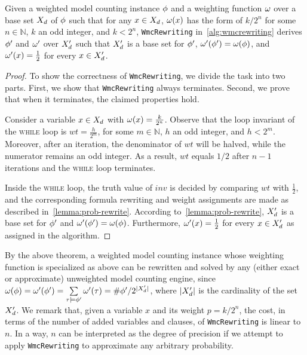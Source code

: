 \begin{theorem}
    \label{thm:prob-rewrite}
    Given a weighted model counting instance $\phi$ and
    a weighting function $\omega$ over a base set $X_d$ of $\phi$ such that
    for any $x\in X_d$, $\omega(x)$ has the form of $k/2^n$
    for some $n\in\mathbb{N}$,
    $k$ an odd integer,
    and $k < 2^n$,
    \texttt{WmcRewriting} in~\cref{alg:wmcrewriting} derives
    $\phi'$ and $\omega'$ over $X_d'$ such that $X_d'$ is a base set for $\phi'$,
    $\omega'(\phi')=\omega(\phi)$,
    and $\omega'(x)=\frac{1}{2}$ for every $x\in X_d'$.
\end{theorem}
\begin{proof}
    To show the correctness of \texttt{WmcRewriting},
    we divide the task into two parts.
    First, we show that \texttt{WmcRewriting} always terminates.
    Second, we prove that when it terminates, the claimed properties hold.

    Consider a variable $x\in X_d$ with $\omega(x)=\frac{k}{2^n}$.
    Observe that the loop invariant of the \textsc{while} loop is $wt=\frac{h}{2^m}$,
    for some $m\in\mathbb{N}$, $h$ an odd integer, and $h<2^m$.
    Moreover, after an iteration, the denominator of $wt$ will be halved,
    while the numerator remains an odd integer.
    As a result, $wt$ equals $1/2$ after $n-1$ iterations and the \textsc{while} loop terminates.

    Inside the \textsc{while} loop,
    the truth value of $inv$ is decided by comparing $wt$ with $\frac{1}{2}$,
    and the corresponding formula rewriting and weight assignments are made as described in~\cref{lemma:prob-rewrite}.
    According to~\cref{lemma:prob-rewrite},
    $X_d'$ is a base set for $\phi'$ and $\omega'(\phi')=\omega(\phi)$.
    Furthermore, $\omega'(x)=\frac{1}{2}$ for every $x\in X_d'$ as assigned in the algorithm.
\end{proof}
By the above theorem,
a weighted model counting instance whose weighting function is specialized as above
can be rewritten and solved by any (either exact or approximate) unweighted model counting engine,
since $\omega(\phi)=\omega'(\phi')=\sum\limits_{\tau\models\phi'}\omega'(\tau)=\#\phi'/2^{|X_d'|}$,
where $|X_d'|$ is the cardinality of the set $X_d'$.
We remark that, given a variable $x$ and its weight $p=k/2^n$,
the cost, in terms of the number of added variables and clauses,
of \texttt{WmcRewriting} is linear to $n$.
In a way, $n$ can be interpreted as the degree of precision
if we attempt to apply \texttt{WmcRewriting} to approximate any arbitrary probability.

